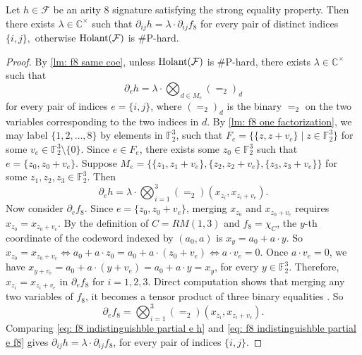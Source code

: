\begin{lemma}\label{lm: f8 indistinguishble}
    Let $h\in \mathcal{F}$ be an arity $8$ signature satisfying the strong equality property.
    Then there exists $\lambda\in \mathbb C^\times$ such that $\partial_{ij}h= \lambda\cdot\partial_{ij}f_8$ for every pair of distinct indices $\{i,j\},$ otherwise $\operatorname{Holant}(\mathcal{F})$ is \#P-hard.
\end{lemma}
\begin{proof}
    By \cref{lm: f8 same coe}, unless $\operatorname{Holant}(\mathcal{F})$ is \#P-hard, there exists $\lambda\in \mathbb C^\times$ such that 
    \begin{equation*}
        \partial_{e}h=\lambda\cdot\bigotimes_{d\in M_e}(=_2)_d
    \end{equation*}
    for every pair of indices $e=\{i,j\}$, where $(=_2)_d$ is the binary $=_2$ on the two variables corresponding to the two indices in $d.$
    By \cref{lm: f8 one factorization}, we may label $\{1,2,\ldots, 8\}$ by elements in $\mathbb F_2^3$, such that $F_e=\{\{z,z+v_e\}\mid z\in \mathbb{F}_2^3\}$ for some $v_e\in \mathbb F_2^3\setminus\{0\}.$
    Since $e\in F_e$, there exists some $z_0\in \mathbb F_2^3$ such that $e=\{z_0,z_0+v_e\}.$
    Suppose $M_e=\{\{z_1,z_1+v_e\},\{z_2,z_2+v_e\},\{z_3,z_3+v_e\}\}$ for some $z_1,z_2,z_3\in \mathbb F_2^3.$
    Then 
    \begin{equation}\label{eq: f8 indistinguishble partial e h}
        \partial_{e}h=\lambda\cdot\bigotimes_{i=1}^3(=_2)(x_{z_i},x_{z_i+v_e}).
    \end{equation}
    Now consider $\partial_{e}f_8$.
    Since $e=\{z_0,z_0+v_e\}$, merging $x_{z_0}$ and $x_{z_0+v_e}$ requires $x_{z_0}=x_{z_0+v_e}.$
    By the definition of $C=RM(1,3)$ and $f_8=\chi_C$, the $y$-th coordinate of the codeword indexed by $(a_0,a)$ is $x_y=a_0+a\cdot y.$
    So $x_{z_0}=x_{z_0+v_e}\iff a_0+a\cdot z_0=a_0+a\cdot (z_0+v_e)\iff a\cdot v_e=0.$
    Once $a\cdot v_e=0$, we have $x_{y+v_e}=a_0+a\cdot (y+v_e)=a_0+a\cdot y=x_y$, for every $y\in \mathbb F_2^3.$
    Therefore, $x_{z_i}=x_{z_i+v_e}$ in $\partial_{e}f_8$ for $i=1,2,3.$
    Direct computation shows that merging any two variables of $f_8$, it becomes a tensor product of three binary equalities \cite{realholant}.
    So
    \begin{equation}\label{eq: f8 indistinguishble partial e f8}
        \partial_{e}f_8=\bigotimes_{i=1}^3(=_2)(x_{z_i},x_{z_i+v_e}).
    \end{equation}
    Comparing \eqref{eq: f8 indistinguishble partial e h} and \eqref{eq: f8 indistinguishble partial e f8} gives $ \partial_{ij}h=\lambda\cdot\partial_{ij}f_8$, for every pair of indices $\{i,j\}$.
\end{proof}

